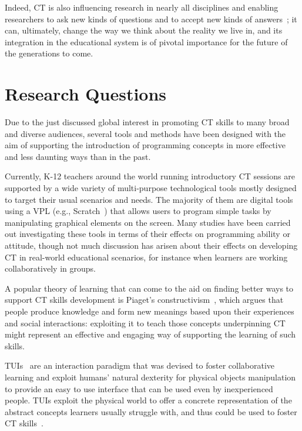 Indeed, \ac{CT} is also influencing research in nearly all disciplines and enabling researchers to ask new kinds of questions and to accept new kinds of answers~\cite{Bundy:2007}; it can, ultimately, change the way we think about the reality we live in, and its integration in the educational system is of pivotal importance for the future of the generations to come.

\section{Research Questions}
Due to the just discussed global interest in promoting \ac{CT} skills to many broad and diverse audiences, several tools and methods have been designed with the aim of supporting the introduction of programming concepts in more effective and less daunting ways than in the past.

Currently, K-12 teachers around the world running introductory \ac{CT} sessions are supported by a wide variety of multi-purpose technological tools mostly designed to target their usual scenarios and needs. The majority of them are digital tools using a \ac{VPL} (e.g., Scratch~\cite{Resnick:2009bd}) that allows users to program simple tasks by manipulating graphical elements on the screen. Many studies have been carried out investigating these tools in terms of their effects on programming ability or attitude, though not much discussion has arisen about their effects on developing \ac{CT} in real-world educational scenarios, for instance when learners are working collaboratively in groups.

A popular theory of learning that can come to the aid on finding better ways to support \ac{CT} skills development is Piaget's constructivism~\cite{Piaget:1969vq}, which argues that people produce knowledge and form new meanings based upon their experiences and social interactions: exploiting it to teach those concepts underpinning \ac{CT} might represent an effective and engaging way of supporting the learning of such skills.

\acp{TUI}~\cite{Ishii:1997gy} are an interaction paradigm that was devised to foster collaborative learning and exploit humans' natural dexterity for physical objects manipulation to provide an easy to use interface that can be used even by inexperienced people. \acp{TUI} exploit the physical world to offer a concrete representation of the abstract concepts learners usually struggle with, and thus could be used to foster \ac{CT} skills~\cite{McNerney:2004jc,Horn:2009be}.

